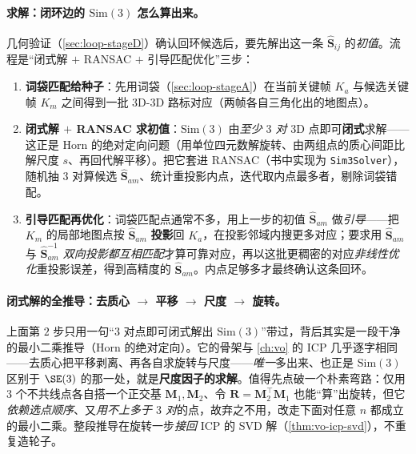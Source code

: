 \paragraph{求解：闭环边的 \texorpdfstring{$\mathrm{Sim}(3)$}{Sim(3)} 怎么算出来。}
几何验证（\cref{sec:loop-stageD}）确认回环候选后，要先解出这一条 $\hat{\mathbf S}_{ij}$ 的\emph{初值}。流程是“闭式解 $+$ RANSAC $+$ 引导匹配优化”三步\cite{murartal2015orbslam,campos2021orbslam3}：
\begin{enumerate}
  \item \textbf{词袋匹配给种子}：先用词袋（\cref{sec:loop-stageA}）在当前关键帧 $K_a$ 与候选关键帧 $K_m$ 之间得到一批 $3$D-$3$D 路标对应（两帧各自三角化出的地图点）。
  \item \textbf{闭式解 $+$ RANSAC 求初值}：$\mathrm{Sim}(3)$ 由\emph{至少 $3$ 对} $3$D 点即可\textbf{闭式}求解——这正是 Horn 的绝对定向问题（用单位四元数解旋转、由两组点的质心间距比解尺度 $s$、再回代解平移）\cite{horn1987closed}。把它套进 RANSAC（书中实现为 \texttt{Sim3Solver}），随机抽 $3$ 对算候选 $\hat{\mathbf S}_{am}$、统计重投影内点，迭代取内点最多者，剔除词袋错配。
  \item \textbf{引导匹配再优化}：词袋匹配点通常不多，用上一步的初值 $\hat{\mathbf S}_{am}$ 做\emph{引导}——把 $K_m$ 的局部地图点按 $\hat{\mathbf S}_{am}$ \textbf{投影}回 $K_a$，在投影邻域内搜更多对应；要求用 $\hat{\mathbf S}_{am}$ 与 $\hat{\mathbf S}_{am}^{-1}$ \emph{双向投影都互相匹配}才算可靠对应，再以这批更稠密的对应\emph{非线性优化}重投影误差，得到高精度的 $\hat{\mathbf S}_{am}$。内点足够多才最终确认这条回环\cite{campos2021orbslam3}。
\end{enumerate}

\paragraph{闭式解的全推导：去质心 $\to$ 平移 $\to$ 尺度 $\to$ 旋转。}
上面第 $2$ 步只用一句“$3$ 对点即可闭式解出 $\mathrm{Sim}(3)$”带过，背后其实是一段干净的最小二乘推导（Horn 的绝对定向\cite{horn1987closed}）。它的骨架与 \cref{ch:vo} 的 ICP 几乎逐字相同——去质心把平移剥离、再各自求旋转与尺度——\emph{唯一}多出来、也正是 $\mathrm{Sim}(3)$ 区别于 $\SE(3)$ 的那一处，就是\textbf{尺度因子的求解}。值得先点破一个朴素弯路：仅用 $3$ 个不共线点各自搭一个正交基 $\mathbf M_1,\mathbf M_2$、令 $\mathbf R=\mathbf M_2^\top\mathbf M_1$ 也能“算”出旋转，但它\emph{依赖选点顺序}、又\emph{用不上多于 $3$ 对}的点，故弃之不用，改走下面对任意 $n$ 都成立的最小二乘\cite{horn1987closed}。整段推导在旋转一步\emph{接回} ICP 的 SVD 解（\cref{thm:vo-icp-svd}），不重复造轮子。

